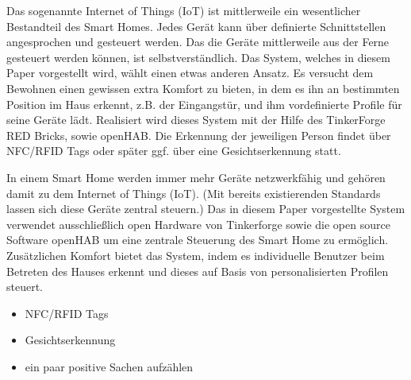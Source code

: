 Das sogenannte Internet of Things (IoT) ist mittlerweile ein wesentlicher Bestandteil des Smart Homes. Jedes Gerät kann über definierte Schnittstellen angesprochen und gesteuert werden. Das die Geräte mittlerweile aus der Ferne gesteuert werden können, ist selbstverständlich. Das System, welches in diesem Paper vorgestellt wird, wählt einen etwas anderen Ansatz. Es versucht dem Bewohnen einen gewissen extra Komfort zu bieten, in dem es ihn an bestimmten Position im Haus erkennt, z.B. der Eingangstür, und ihm vordefinierte Profile für seine Geräte lädt. Realisiert wird dieses System mit der Hilfe des TinkerForge RED Bricks, sowie openHAB. Die Erkennung der jeweiligen Person findet über NFC/RFID Tags oder später ggf. über eine Gesichtserkennung statt.

In einem Smart Home werden immer mehr Geräte netzwerkfähig und gehören damit zu dem Internet of Things (IoT).
(Mit bereits existierenden Standards lassen sich diese Geräte zentral steuern.)
Das in diesem Paper vorgestellte System verwendet ausschließlich open Hardware von Tinkerforge sowie die open source Software openHAB
um eine zentrale Steuerung des Smart Home zu ermöglich.
Zusätzlichen Komfort bietet das System, indem es individuelle Benutzer beim Betreten des Hauses erkennt und dieses auf Basis von personalisierten Profilen steuert.
\begin{itemize}
	\item NFC/RFID Tags
	\item Gesichtserkennung
	\item ein paar positive Sachen aufzählen
\end{itemize}